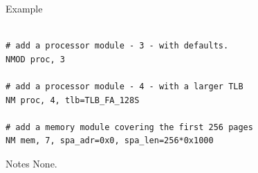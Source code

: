 \begin{iPageDescOpEntry}{Example}
\begin{lstlisting}[style=iPageOpStyle]

# add a processor module - 3 - with defaults.
NMOD proc, 3

# add a processor module - 4 - with a larger TLB                   
NM proc, 4, tlb=TLB_FA_128S

# add a memory module covering the first 256 pages
NM mem, 7, spa_adr=0x0, spa_len=256*0x1000

\end{lstlisting}
\end{iPageDescOpEntry}

\begin{iPageDescEntry}{Notes}
None.
\end{iPageDescEntry}
